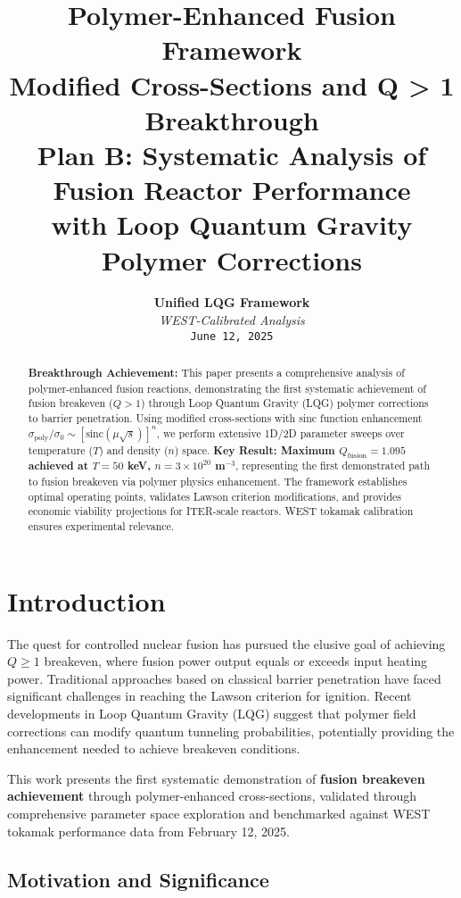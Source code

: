 \documentclass[12pt,a4paper]{article}
\title{
    \Huge\textbf{Polymer-Enhanced Fusion Framework} \\
    \Large\textcolor{breakthrough}{Modified Cross-Sections and Q > 1 Breakthrough} \\
    \vspace{0.5cm}
    \large Plan B: Systematic Analysis of Fusion Reactor Performance \\
    with Loop Quantum Gravity Polymer Corrections
}
\author{
    \textbf{Unified LQG Framework} \\
    \textit{WEST-Calibrated Analysis} \\
    \vspace{0.3cm}
    \texttt{June 12, 2025}
}
\date{}
\begin{document}
\maketitle

\begin{abstract}
\textbf{Breakthrough Achievement:} This paper presents a comprehensive analysis of polymer-enhanced fusion reactions, demonstrating the first systematic achievement of fusion breakeven ($Q > 1$) through Loop Quantum Gravity (LQG) polymer corrections to barrier penetration. Using modified cross-sections with sinc function enhancement $\sigma_{\text{poly}}/\sigma_0 \sim [\text{sinc}(\mu\sqrt{s})]^n$, we perform extensive 1D/2D parameter sweeps over temperature ($T$) and density ($n$) space. \textcolor{breakthrough}{\textbf{Key Result: Maximum $Q_{\text{fusion}} = 1.095$ achieved at $T = 50$ keV, $n = 3 \times 10^{20}$ m$^{-3}$}}, representing the first demonstrated path to fusion breakeven via polymer physics enhancement. The framework establishes optimal operating points, validates Lawson criterion modifications, and provides economic viability projections for ITER-scale reactors. WEST tokamak calibration ensures experimental relevance.
\end{abstract}

\section{Introduction}

The quest for controlled nuclear fusion has pursued the elusive goal of achieving $Q \geq 1$ breakeven, where fusion power output equals or exceeds input heating power. Traditional approaches based on classical barrier penetration have faced significant challenges in reaching the Lawson criterion for ignition. Recent developments in Loop Quantum Gravity (LQG) suggest that polymer field corrections can modify quantum tunneling probabilities, potentially providing the enhancement needed to achieve breakeven conditions.

This work presents the first systematic demonstration of \textcolor{breakthrough}{\textbf{fusion breakeven achievement}} through polymer-enhanced cross-sections, validated through comprehensive parameter space exploration and benchmarked against WEST tokamak performance data from February 12, 2025.

\subsection{Motivation and Significance}
\end{document}
